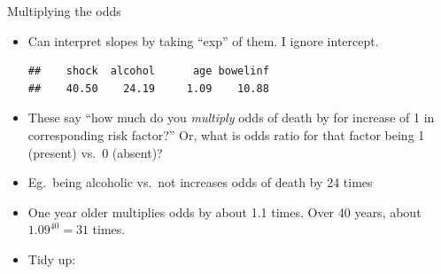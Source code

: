 \begin{frame}[fragile]{Multiplying the odds}

  \begin{itemize}
  \item Can interpret slopes by taking ``exp'' of them. I ignore intercept.

 
\begin{knitrout}
\color{fgcolor}\begin{kframe}
\begin{alltt}
\hlkwb{=}\hlstd{(}\hlstd{(sepsis.2)[}\hlopt{-}\hlstd{])}
\hlstd{)}
\end{alltt}
\begin{verbatim}
##    shock  alcohol      age bowelinf 
##    40.50    24.19     1.09    10.88
\end{verbatim}
\end{kframe}
\end{knitrout}

\item These say ``how much do you \emph{multiply} odds of death by
    for increase of 1 in corresponding risk factor?'' Or, what is odds
    ratio for that factor being 1 (present) vs.\ 0 (absent)?
  \item Eg.\ being alcoholic vs.\ not increases odds of death by 24 times
  \item One year older multiplies odds by about 1.1 times. Over 40 years,
    about  $1.09^{40}=31$ times. 
  \item Tidy up:
 
\begin{knitrout}
\color{fgcolor}\begin{kframe}
\begin{alltt}
\end{alltt}
\end{kframe}
\end{knitrout}
    

  \end{itemize}
  
\end{frame}

